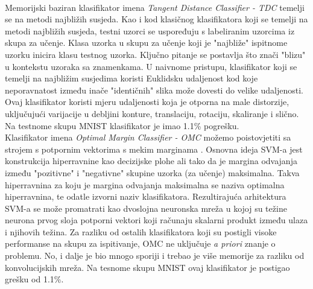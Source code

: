 \documentclass[times, utf8, diplomski]{fer}
\theoremstyle{definition}
\begin{document}
\\
Memorijski baziran klasifikator imena \textit{Tangent Distance Classifier - TDC} temelji se na metodi najbližih susjeda. Kao i kod klasičnog klasifikatora koji se temelji na metodi najbližih susjeda, testni uzorci se uspoređuju s labeliranim uzorcima iz skupa za učenje. Klasa uzorka u skupu za učenje koji je "najbliže" ispitnome uzorku inicira klasu testnog uzorka. Ključno pitanje se postavlja što znači "blizu" u kontekstu uzoraka sa znamenkama. U naivnome pristupu, klasifikator koji se temelji na najbližim susjedima koristi Euklidsku udaljenost kod koje neporavnatost između inače "identičnih" slika može dovesti do velike udaljenosti. Ovaj klasifikator koristi mjeru udaljenosti koja je otporna na male distorzije, uključujući varijacije u debljini konture, translaciju, rotaciju, skaliranje i slično. Na  testnome skupu MNIST klasifikator je imao 1.1\% pogrešku.
\\
Klasifikator imena \textit{Optimal Margin Classifier - OMC} možemo poistovjetiti sa strojem s potpornim vektorima  \cite{Boser92atraining} s mekim marginama \cite{Cortes:1995:SN:218919.218929}. Osnovna ideja SVM-a jest konstrukcija hiperravnine kao decizijske plohe ali tako da je margina odvajanja između "pozitivne" i "negativne" skupine uzorka (za učenje) maksimalna. Takva hiperravnina za koju je margina odvajanja maksimalna se naziva optimalna hiperravnina, te odatle izvorni naziv klasifikatora. Rezultirajuća arhitektura SVM-a se može promatrati kao dvoslojna neuronska mreža u kojoj su težine neurona prvog sloja potporni vektori koji računaju skalarni produkt između ulaza i njihovih težina. Za razliku od ostalih klasifikatora koji su postigli visoke performanse na skupu za ispitivanje, OMC ne uključuje \textit{a priori} znanje o problemu. No, i dalje je bio mnogo sporiji i trebao je više memorije za razliku od konvolucijskih mreža. Na tesnome skupu MNIST ovaj klasifikator je postigao grešku od 1.1\%.
\\
\end{document}
